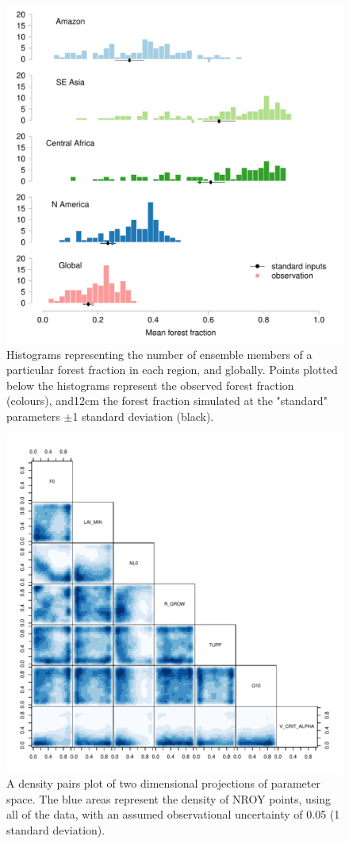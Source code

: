 \documentclass[esd, manuscript]{copernicus}
\begin{document}
\begin{figure}[t]
\includegraphics[width=12cm]{graphics/fraction_histogram_with_discrepancy_standard.pdf}
\caption{Histograms representing the number of ensemble members of a particular forest fraction in each region, and globally. Points plotted below the histograms represent the observed forest fraction (colours), and12cm the forest fraction simulated at the "standard" parameters $\pm$1 standard deviation (black).}
\label{fig:fraction_histogram_with_discrepancy_standard}
\end{figure}

\begin{figure}[t]
\includegraphics[width=12cm]{graphics/credible_NROY.pdf}
\caption{A density pairs plot of two dimensional projections of parameter space. The blue areas represent the density of NROY points, using all of the data, with an assumed observational uncertainty of 0.05 (1 standard deviation).}
\label{fig:credible_NROY}
\end{figure}
\end{document}

